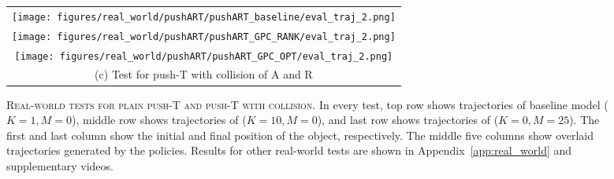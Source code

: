 \begin{figure*}[h]
\begin{minipage}{\textwidth}
\begin{tabular}{c}
            \hspace{-4mm}
            \begin{minipage}{\textwidth}
                \centering
                \texttt{[image: figures/real\_world/pushART/pushART\_baseline/eval\_traj\_2.png]}
            \end{minipage}
            \\
            \hspace{-4mm}
            \begin{minipage}{\textwidth}
                \centering
                \texttt{[image: figures/real\_world/pushART/pushART\_GPC\_RANK/eval\_traj\_2.png]}
            \end{minipage}
            \\
            \hspace{-4mm}
            \begin{minipage}{\textwidth}
                \centering
                \texttt{[image: figures/real\_world/pushART/pushART\_GPC\_OPT/eval\_traj\_2.png]}
            \end{minipage}
            \\
            \multicolumn{1}{c}{\small (c) Test for push-T with collision of A and R}
            \\ 
        \end{tabular}
    \end{minipage}
    \vspace{-2mm}
    \caption{\textsc{Real-world tests for plain push-T and push-T with collision.} In every test, top row shows trajectories of baseline model ($K=1, M=0$), middle row shows trajectories of \gpcrank ($K=10, M=0$), and last row shows trajectories of \gpcopt ($K=0, M=25$). The first and last column show the initial and final position of the object, respectively. The middle five columns show overlaid trajectories generated by the policies. Results for other real-world tests are shown in Appendix~\ref{app:real_world} and supplementary videos.
    \label{fig:fig-real_world_main_paper}}
\end{figure*}